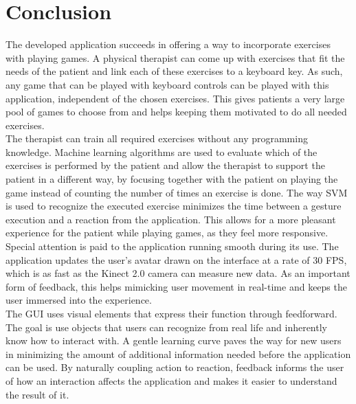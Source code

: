 \chapter{Conclusion}

The developed application succeeds in offering a way to incorporate exercises with playing games. A physical therapist can come up with exercises that fit the needs of the patient and link each of these exercises to a keyboard key. As such, any game that can be played with keyboard controls can be played with this application, independent of the chosen exercises. This gives patients a very large pool of games to choose from and helps keeping them motivated to do all needed exercises.\\

The therapist can train all required exercises without any programming knowledge. Machine learning algorithms are used to evaluate which of the exercises is performed by the patient and allow the therapist to support the patient in a different way, by focusing together with the patient on playing the game instead of counting the number of times an exercise is done. The way SVM is used to recognize the executed exercise minimizes the time between a gesture execution and a reaction from the application. This allows for a more pleasant experience for the patient while playing games, as they feel more responsive.\\

Special attention is paid to the application running smooth during its use. The application updates the user's avatar drawn on the interface at a rate of 30 FPS, which is as fast as the Kinect 2.0 camera can measure new data. As an important form of feedback, this helps mimicking user movement in real-time and keeps the user immersed into the experience.\\

The GUI uses visual elements that express their function through feedforward. The goal is use objects that users can recognize from real life and inherently know how to interact with. A gentle learning curve paves the way for new users in minimizing the amount of additional information needed before the application can be used. By naturally coupling action to reaction, feedback informs the user of how an interaction affects the application and makes it easier to understand the result of it.\\
